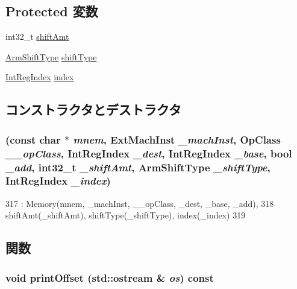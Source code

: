 \subsection*{Protected 変数}
\begin{DoxyCompactItemize}
\item 
int32\_\-t \hyperlink{classArmISA_1_1MemoryReg_a378dfadeb317c390962c147be928d92d}{shiftAmt}
\item 
\hyperlink{namespaceArmISA_a209d79feaaef0aa2f54ae62e53ee90de}{ArmShiftType} \hyperlink{classArmISA_1_1MemoryReg_ae5b7df4bd366c5419743bf5f679485b9}{shiftType}
\item 
\hyperlink{namespaceArmISA_ae64680ba9fb526106829d6bf92fc791b}{IntRegIndex} \hyperlink{classArmISA_1_1MemoryReg_a2702f107e28b9d4c6161cead23d7e0b4}{index}
\end{DoxyCompactItemize}


\subsection{コンストラクタとデストラクタ}
\hypertarget{classArmISA_1_1MemoryReg_a265770bfa42ef839ee5461eff726d53c}{
\subsubsection[{MemoryReg}]{ (const char $\ast$ {\em mnem}, \/  {\bf ExtMachInst} {\em \_\-machInst}, \/  OpClass {\em \_\-\_\-opClass}, \/  {\bf IntRegIndex} {\em \_\-dest}, \/  {\bf IntRegIndex} {\em \_\-base}, \/  bool {\em \_\-add}, \/  int32\_\-t {\em \_\-shiftAmt}, \/  {\bf ArmShiftType} {\em \_\-shiftType}, \/  {\bf IntRegIndex} {\em \_\-index})}}
\label{classArmISA_1_1MemoryReg_a265770bfa42ef839ee5461eff726d53c}



\begin{DoxyCode}
317         : Memory(mnem, _machInst, __opClass, _dest, _base, _add),
318           shiftAmt(_shiftAmt), shiftType(_shiftType), index(_index)
319     {}
\end{DoxyCode}


\subsection{関数}
\hypertarget{classArmISA_1_1MemoryReg_a7fdadf47668a31b2e7b99f0cc36c5d4f}{
\subsubsection[{printOffset}]{\setlength{\rightskip}{0pt plus 5cm}void printOffset (std::ostream \& {\em os}) const}}
\label{classArmISA_1_1MemoryReg_a7fdadf47668a31b2e7b99f0cc36c5d4f}


